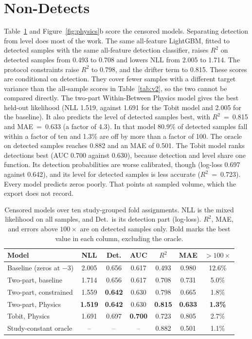 \documentclass[12pt,a4paper]{report}
\newcommand{\Rsq}{$R^2$}
\begin{document}
\section{Non-Detects}

Table~\ref{tab:censored} and Figure~\ref{fig:physics}b score the censored models. Separating detection from level does most of the work. The same all-feature LightGBM, fitted to detected samples with the same all-feature detection classifier, raises \Rsq{} on detected samples from 0.493 to 0.708 and lowers NLL from 2.005 to 1.714. The protocol constraints raise \Rsq{} to 0.798, and the drifter term to 0.815. These scores are conditional on detection. They cover fewer samples with a different target variance than the all-sample scores in Table~\ref{tab:v2}, so the two cannot be compared directly. The two-part Within-Between Physics model gives the best held-out likelihood (NLL 1.519, against 1.691 for the Tobit model and 2.005 for the baseline). It also predicts the level of detected samples best, with \Rsq{}~=~0.815 and MAE~=~0.633 (a factor of 4.3). In that model 80.9\% of detected samples fall within a factor of ten and 1.3\% are off by more than a factor of 100. The oracle on detected samples reaches 0.882 and an MAE of 0.501. The Tobit model ranks detections best (AUC 0.700 against 0.630), because detection and level share one function. Its detection probabilities are worse calibrated, though (log-loss 0.697 against 0.642), and its level for detected samples is less accurate (\Rsq{}~=~0.723). Every model predicts zeros poorly. That points at sampled volume, which the export does not record.

\begin{table}[!htbp]
\centering
\caption[Censored models for non-detects]{Censored models over ten study-grouped fold assignments. NLL is the mixed likelihood on all samples, and Det.\ is its detection part (log-loss). \Rsq{}, MAE, and errors above $100\times$ are on detected samples only. Bold marks the best value in each column, excluding the oracle.}
\label{tab:censored}
\setlength{\tabcolsep}{2.5pt}
\begin{tabular}{@{}lcccccc@{}}
\toprule
Model & NLL & Det. & AUC & \Rsq{} & MAE & $>100\times$\\
\midrule
Baseline (zeros at $-3$) & 2.005 & 0.656 & 0.617 & 0.493 & 0.980 & 12.6\%\\
Two-part, baseline & 1.714 & 0.656 & 0.617 & 0.708 & 0.731 & 5.0\%\\
Two-part, constrained & 1.559 & \textbf{0.642} & 0.630 & 0.798 & 0.665 & 1.8\%\\
Two-part, Physics & \textbf{1.519} & \textbf{0.642} & 0.630 & \textbf{0.815} & \textbf{0.633} & \textbf{1.3\%}\\
Tobit, Physics & 1.691 & 0.697 & \textbf{0.700} & 0.723 & 0.805 & 2.7\%\\
\midrule
Study-constant oracle & -- & -- & -- & 0.882 & 0.501 & 1.1\%\\
\bottomrule
\end{tabular}
\end{table}
\end{document}
